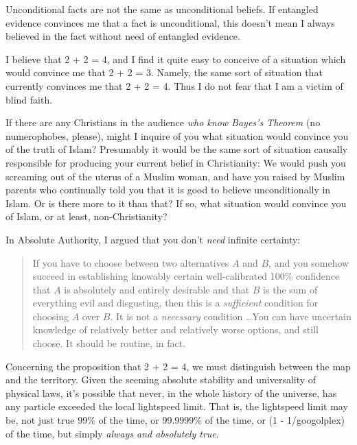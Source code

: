 {
 Unconditional facts are not the same as unconditional beliefs. If
entangled evidence convinces me that a fact is unconditional, this
doesn't mean I always believed in the fact without need
of entangled evidence.}

{
 I believe that 2 + 2 = 4, and I find it quite easy to conceive of
a situation which would convince me that 2 + 2 = 3. Namely, the same
sort of situation that currently convinces me that 2 + 2 = 4. Thus I do
not fear that I am a victim of blind faith.}

{
 If there are any Christians in the audience \textit{who know
Bayes's Theorem} (no numerophobes, please), might I
inquire of you what situation would convince you of the truth of Islam?
Presumably it would be the same sort of situation causally responsible
for producing your current belief in Christianity: We would push you
screaming out of the uterus of a Muslim woman, and have you raised by
Muslim parents who continually told you that it is good to believe
unconditionally in Islam. Or is there more to it than that? If so, what
situation would convince you of Islam, or at least, non-Christianity?}

\myendsectiontext


{
 In Absolute Authority, I argued that you don't
\textit{need} infinite certainty:}

\begin{quote}
{
 If you have to choose between two alternatives $A$ and $B$, and you
somehow succeed in establishing knowably certain well-calibrated 100\%
confidence that $A$ is absolutely and entirely desirable and that $B$ is
the sum of everything evil and disgusting, then this is a
\textit{sufficient} condition for choosing $A$ over $B$. It is not a
\textit{necessary} condition \ldots You can have uncertain knowledge of
relatively better and relatively worse options, and still choose. It
should be routine, in fact.}
\end{quote}

{
 Concerning the proposition that 2 + 2 = 4, we must distinguish
between the map and the territory. Given the seeming absolute stability
and universality of physical laws, it's possible that
never, in the whole history of the universe, has any particle exceeded
the local lightspeed limit. That is, the lightspeed limit may be, not
just true 99\% of the time, or 99.9999\% of the time, or (1 -
1/googolplex) of the time, but simply \textit{always and absolutely
true}.}

